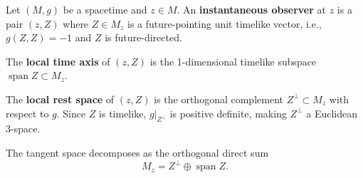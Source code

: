 Let $(M, g)$ be a spacetime and $z \in M$. An \textbf{instantaneous observer} at $z$ is a pair $(z, Z)$ where $Z \in M_z$ is a future-pointing unit timelike vector, i.e., $g(Z, Z) = -1$ and $Z$ is future-directed.

The \textbf{local time axis} of $(z, Z)$ is the 1-dimensional timelike subspace $\operatorname{span} Z \subset M_z$.

The \textbf{local rest space} of $(z, Z)$ is the orthogonal complement $Z^\perp \subset M_z$ with respect to $g$. Since $Z$ is timelike, $g|_{Z^\perp}$ is positive definite, making $Z^\perp$ a Euclidean 3-space.

The tangent space decomposes as the orthogonal direct sum
$$M_z = Z^\perp \oplus \operatorname{span} Z.$$
